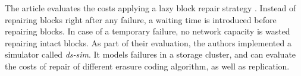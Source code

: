The article evaluates the costs applying a lazy block repair strategy \autocite{Silberstein2014}.
Instead of repairing blocks right after any failure, a waiting time is introduced before repairing blocks.
In case of a temporary failure, no network capacity is wasted repairing intact blocks.
As part of their evaluation, the authors implemented a simulator called \textit{ds-sim}.
It models failures in a storage cluster, and can evaluate the costs of repair of different erasure coding algorithm, as well as replication.
